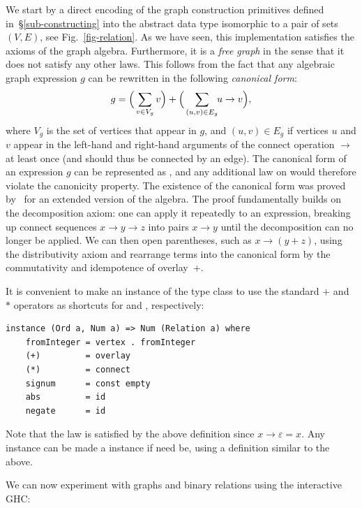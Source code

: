 We start by a direct encoding of the graph construction primitives defined
in~\S\ref{sub-constructing} into the abstract data type  isomorphic
to a pair of sets $(V,E)$, see Fig.~\ref{fig-relation}. As we have seen,
this implementation satisfies the axioms of the graph algebra. Furthermore, it
is a \emph{free graph} in the sense that it does not satisfy any other laws.
This follows from the fact that any algebraic graph expression $g$ can be
rewritten in the following \emph{canonical form}:
\[
g = \Big(\sum_{v\in V_g} v\Big) + \Big(\sum_{(u,v)\in E_g} \hspace{-1mm} u \rightarrow v\Big),
\]
\noindent
where $V_g$ is the set of vertices that appear in $g$, and $(u,v)\in E_g$ if
vertices $u$ and $v$ appear in the left-hand and right-hand arguments of
the connect operation $\rightarrow$ at least once (and should thus be connected
by an edge). The canonical form of an
expression $g$ can be represented as , and any additional
law on  would therefore violate the canonicity property.
The existence of the canonical form was proved by~\citet{2014_algebra_mokhov}
for an extended version of the algebra. The proof fundamentally builds on the
decomposition axiom: one can apply it repeatedly to an expression, breaking up
connect sequences $x\rightarrow y\rightarrow z$ into pairs $x \rightarrow y$
until the decomposition can no longer be applied. We can then open parentheses,
such as $x\rightarrow (y + z)$, using the distributivity axiom and rearrange
terms into the canonical form by the commutativity and idempotence of overlay~$+$.

It is convenient to make  an instance of the  type class
to use the standard $+$ and $*$ operators as shortcuts for  and
, respectively:

\begin{verbatim}
instance (Ord a, Num a) => Num (Relation a) where
    fromInteger = vertex . fromInteger
    (+)         = overlay
    (*)         = connect
    signum      = const empty
    abs         = id
    negate      = id
\end{verbatim}

\noindent
Note that the  law  is satisfied by the above
definition since $x \rightarrow \varepsilon = x$. Any  instance
can be made a  instance if need be, using a definition similar to the above.

We can now experiment with graphs and binary relations using the interactive GHC:

